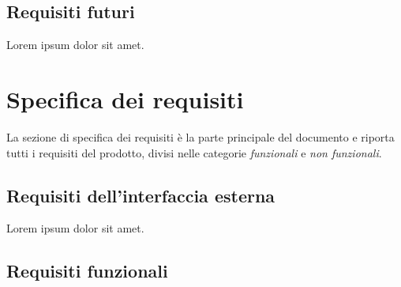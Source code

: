 \documentclass{scrreprt}
\begin{document}

\section{Requisiti futuri}
Lorem ipsum dolor sit amet.


\chapter{Specifica dei requisiti}
La sezione di specifica dei requisiti è la parte principale del
documento e riporta tutti i requisiti del prodotto, divisi nelle
categorie \textit{funzionali} e \textit{non funzionali}.


\section{Requisiti dell'interfaccia esterna}
Lorem ipsum dolor sit amet.


\section{Requisiti funzionali}
%
%
%
\end{document}
